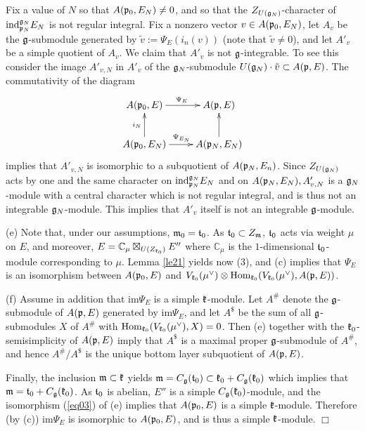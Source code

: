 \documentclass[12pt]{article}
\newcommand {\CC} {\mathbb {C}}
\newcommand{\refle}[1]{Lemma \ref{#1}}
\newcommand{\refeq}[1]{(\ref{#1})}
\newcommand{\qed}{$\Box$}
\def\Hom{\text{\rm Hom}}
\def\m{\frak m}
\def\t{\frak t}
\begin{document}
Fix a value of $N$ so that $A(\frak p_0, E_N)\neq 0$, and so that the $Z_{U(\frak g_{N})}$-character of $\text{ind}^{\frak g_{N}} _{\frak p_{N}} E_N$ is not regular integral.  Fix a nonzero vector $v\in A(\frak p_0, E_N)$, let $A_v$ be the $\frak g$-submodule generated by $\tilde v  := \Psi_E (i_n(v))$ (note that $\tilde v\neq 0$), and let $A'_v$ be a simple quotient of $A_v$.  We claim that $A'_v$ is not $\frak g$-integrable.  To see this consider the image $A'_{v,N}$ in $A'_v$ of the $\frak g_N$-submodule $U(\frak g_N)\cdot\tilde v \subset A(\frak p,E)$.  The commutativity of the diagram
$$\xymatrix{
A(\frak p_0, E) \ar[r]^{\Psi_E}& A(\frak p,E) \\
A(\frak p_0, E_N) \ar[u]^{i_N}\ar[r]^{\Psi_{E_{N}}} &A(\frak p_N, E_N)\ar[u] }
$$
implies that $A'_{v,N}$ is isomorphic to a subquotient of $A(\frak p_N,E_n)$.  Since  $Z_{U(\frak g_{N})}$ acts by one and the same character on $\text{ind}^{\frak g_{N}}_{\frak p_{N}} E_N$ and on $A(\frak p_N, E_N), A'_{v,N}$ is a $\frak g_N$-module with a central character which is not regular integral, and is thus not an integrable $\frak g_N$-module.  This implies that $A'_v$ itself is not an integrable $\frak g$-module.

\item[(e)] Note that, under our assumptions, $\frak m_0 = \frak t_0$.  As $\frak t_0\subset Z_\m$, $\t_0$ acts via weight $\mu$ on $E$, and moreover, $E = \CC_\mu \boxtimes_{U(Z_{\frak k_{0}})} E''$ where $\CC_\mu$ is the $1$-dimensional $\frak t_0$-module corresponding to $\mu$.  \refle{le21} yields now (3), and (c) implies that $\Psi_E$ is an isomorphism between $A(\frak p_0,E)$ and $V_{\frak k_{0}} (\mu^{\vee})\otimes\Hom_{\frak k_{0}} (V_{\frak k_{0}} (\mu^{\vee}), A(\frak p,E))$.

\item[(f)] Assume in addition that $\text{im} \Psi_E$ is a simple $\frak k$-module.  Let $A^{\#}$ denote the $\frak g$-submodule of $A(\frak p,E)$ generated by $\text{im} \Psi_E$, and let $A^{\$}$ be the sum of all $\frak g$-submodules $X$ of $A^{\#}$ with $\Hom_{\frak k_{0}} (V_{\frak k_{0}} (\mu^{\vee}), X) = 0$.  Then (e) together with the $\frak k_0$-semisimplicity of $A(\frak p,E)$ imply that $A^{\$} $ is a maximal proper $\frak g$-submodule of $A^{\#}$, and hence $A^{\#}/A^{\$} $ is the unique bottom layer subquotient of $A(\frak p,E)$.

Finally, the inclusion $\frak m\subset \frak k$ yields $\frak m = C_{\frak g} (\frak t_0)\subset \frak k_0+ C_{\frak g} (\frak k_0)$ which implies that  $\frak m = \frak t_0 + C_{\frak g} (\frak k_0)$.  As $\frak t_0$ is abelian, $E''$ is a simple $C_{\frak g} (\frak k_0)$-module, and the isomorphism \refeq{eq03} of (e) implies that $A(\frak p_0, E)$ is a simple $\frak k$-module.  Therefore (by (c)) $\text{im} \Psi_E$ is isomorphic to $A(\frak p_0, E)$, and is thus a simple $\frak k$-module.  \qed
\end{document}
